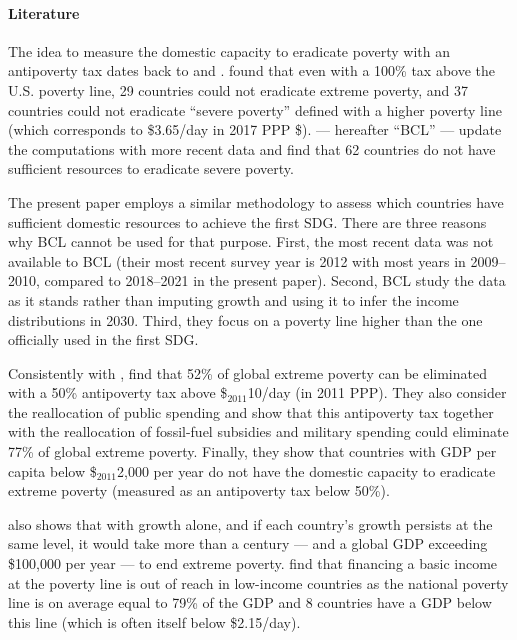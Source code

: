 \documentclass[12pt,english]{article}
\begin{document}
\paragraph{Literature} 

The idea to measure the domestic capacity to eradicate poverty with an antipoverty tax dates back to \cite{ravallion_poorer_2010} and \citealp{ceriani_income_2014}. \cite{ravallion_poorer_2010} found that even with a 100\% tax above the U.S. poverty line, 29 countries could not eradicate extreme poverty, and 37 countries could not eradicate ``severe poverty'' defined with a higher poverty line (which corresponds to \$3.65/day in 2017 PPP \$). %
\cite{bolch_arithmetics_2022} --- hereafter ``BCL'' --- update the computations with more recent data and find that 62 countries do not have sufficient resources to eradicate severe poverty. %

The present paper employs a similar methodology to assess which countries have sufficient domestic resources to achieve the first SDG. There are three reasons why BCL cannot be used %
for that purpose. 
First, the most recent data was not available to BCL (their most recent survey year is 2012 with most years in 2009--2010, compared to 2018--2021 in the present paper). %
Second, BCL study the data as it stands rather than imputing growth and using it to infer the income distributions in 2030. Third, they focus on a poverty line higher than the one officially used in the first SDG.

Consistently with \cite{ravallion_poorer_2010}, \cite{hoy_gasoline_2016} find that 52\% of global extreme poverty can be eliminated with a 50\% antipoverty tax above \$$_\text{2011}$10/day (in 2011 PPP). They also consider the reallocation of public spending and show that this antipoverty tax together with the reallocation of fossil-fuel subsidies and military spending could eliminate 77\% of global extreme poverty. Finally, they show that countries with GDP per capita below \$$_\text{2011}$2,000 per year do not have the domestic capacity to eradicate extreme poverty (measured as an antipoverty tax below 50\%).

\cite{woodward_incrementum_2015} also shows that with growth alone, and if each country's growth persists at the same level, it would take more than a century --- and a global GDP exceeding \$100,000 per year --- to end extreme poverty. %
\cite{ortiz_universal_2018} find that financing a basic income at the poverty line is out of reach in low-income countries as the national poverty line is on average equal to 79\% of the GDP and 8 countries have a GDP below this line (which is often itself below \$2.15/day).
\end{document}
